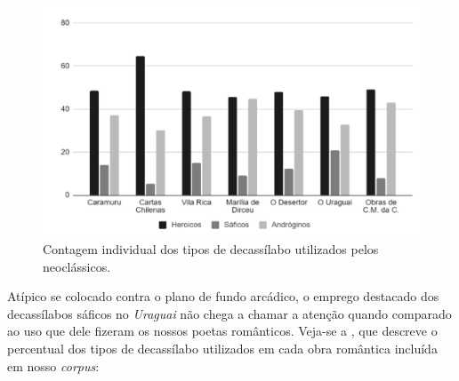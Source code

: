 \documentclass[portuguese]{textolivre}
\begin{document}
\begin{figure}
    \centering
    \begin{minipage}{0.75\linewidth}
    \includegraphics[width=\linewidth]{fig-002.pdf}
    \caption{Contagem individual dos tipos de decassílabo utilizados pelos neoclássicos.}
    \label{fig2}
    \end{minipage}
\end{figure}

Atípico se colocado contra o plano de fundo arcádico, o emprego destacado dos decassílabos sáficos no \textit{Uraguai} não chega a chamar a atenção quando comparado ao uso que dele fizeram os nossos poetas românticos. Veja-se a , que descreve o percentual dos tipos de decassílabo utilizados em cada obra romântica incluída em nosso \textit{corpus}:
\end{document}
